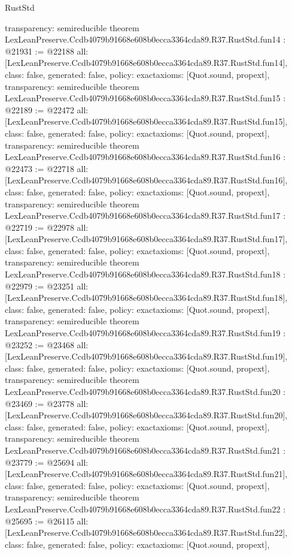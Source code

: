 \begin{lexlean}{RustStd}
\begin{coremodule}
{  transparency: semireducible
}
theorem LexLeanPreserve.Ccdb4079b91668e608b0ecca3364cda89.R37.RustStd.fun14 : @21931 := @22188 {
  all: [LexLeanPreserve.Ccdb4079b91668e608b0ecca3364cda89.R37.RustStd.fun14],
  class: false,
  generated: false,
  policy: exact{axioms: [Quot.sound, propext]},
  transparency: semireducible
}
theorem LexLeanPreserve.Ccdb4079b91668e608b0ecca3364cda89.R37.RustStd.fun15 : @22189 := @22472 {
  all: [LexLeanPreserve.Ccdb4079b91668e608b0ecca3364cda89.R37.RustStd.fun15],
  class: false,
  generated: false,
  policy: exact{axioms: [Quot.sound, propext]},
  transparency: semireducible
}
theorem LexLeanPreserve.Ccdb4079b91668e608b0ecca3364cda89.R37.RustStd.fun16 : @22473 := @22718 {
  all: [LexLeanPreserve.Ccdb4079b91668e608b0ecca3364cda89.R37.RustStd.fun16],
  class: false,
  generated: false,
  policy: exact{axioms: [Quot.sound, propext]},
  transparency: semireducible
}
theorem LexLeanPreserve.Ccdb4079b91668e608b0ecca3364cda89.R37.RustStd.fun17 : @22719 := @22978 {
  all: [LexLeanPreserve.Ccdb4079b91668e608b0ecca3364cda89.R37.RustStd.fun17],
  class: false,
  generated: false,
  policy: exact{axioms: [Quot.sound, propext]},
  transparency: semireducible
}
theorem LexLeanPreserve.Ccdb4079b91668e608b0ecca3364cda89.R37.RustStd.fun18 : @22979 := @23251 {
  all: [LexLeanPreserve.Ccdb4079b91668e608b0ecca3364cda89.R37.RustStd.fun18],
  class: false,
  generated: false,
  policy: exact{axioms: [Quot.sound, propext]},
  transparency: semireducible
}
theorem LexLeanPreserve.Ccdb4079b91668e608b0ecca3364cda89.R37.RustStd.fun19 : @23252 := @23468 {
  all: [LexLeanPreserve.Ccdb4079b91668e608b0ecca3364cda89.R37.RustStd.fun19],
  class: false,
  generated: false,
  policy: exact{axioms: [Quot.sound, propext]},
  transparency: semireducible
}
theorem LexLeanPreserve.Ccdb4079b91668e608b0ecca3364cda89.R37.RustStd.fun20 : @23469 := @23778 {
  all: [LexLeanPreserve.Ccdb4079b91668e608b0ecca3364cda89.R37.RustStd.fun20],
  class: false,
  generated: false,
  policy: exact{axioms: [Quot.sound, propext]},
  transparency: semireducible
}
theorem LexLeanPreserve.Ccdb4079b91668e608b0ecca3364cda89.R37.RustStd.fun21 : @23779 := @25694 {
  all: [LexLeanPreserve.Ccdb4079b91668e608b0ecca3364cda89.R37.RustStd.fun21],
  class: false,
  generated: false,
  policy: exact{axioms: [Quot.sound, propext]},
  transparency: semireducible
}
theorem LexLeanPreserve.Ccdb4079b91668e608b0ecca3364cda89.R37.RustStd.fun22 : @25695 := @26115 {
  all: [LexLeanPreserve.Ccdb4079b91668e608b0ecca3364cda89.R37.RustStd.fun22],
  class: false,
  generated: false,
  policy: exact{axioms: [Quot.sound, propext]},
}
\end{coremodule}
\end{lexlean}
